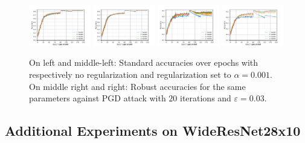 \begin{figure}[ht]
    \centering
    \includegraphics[width=0.24\textwidth]{Images/standard_acc_finalrun_ResNet18_1024_200_-1_bis.pdf}    \includegraphics[width=0.24\textwidth]{Images/standard_acc_finalrun_ResNet18_1024_200_0.001_bis.pdf}
    \includegraphics[width=0.24\textwidth]{Images/robust_acc_finalrun_ResNet18_1024_200_-1_bis.pdf}    \includegraphics[width=0.24\textwidth]{Images/robust_acc_finalrun_ResNet18_1024_200_0.001_bis.pdf}
    \caption{On left and middle-left: Standard accuracies over epochs with respectively no regularization and regularization set to $\alpha=0.001$. On middle right and right: Robust accuracies for the same parameters against PGD attack with $20$ iterations and $\varepsilon=0.03$.}
    \label{fig:xp-regularization}
\end{figure}

\subsection{Additional Experiments on WideResNet28x10}

